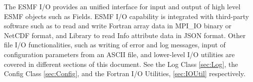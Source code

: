

The ESMF I/O provides an unified interface for input and output of
high level ESMF objects such as Fields.  ESMF I/O capability is integrated
with third-party software such as 
to read and write Fortran array data in MPI\_IO binary or NetCDF format, and 
Library to read Info attribute data in JSON format.  Other file I/O
functionalities, such as writing of error and log messages, input of
configuration parameters from an ASCII file, and lower-level I/O utilities are
covered in different sections of this document.  See the Log Class 
\ref{sec:Log}, the Config Class \ref{sec:Config}, and the Fortran 
I/O Utilities, \ref{sec:IOUtil} respectively.

%
%


